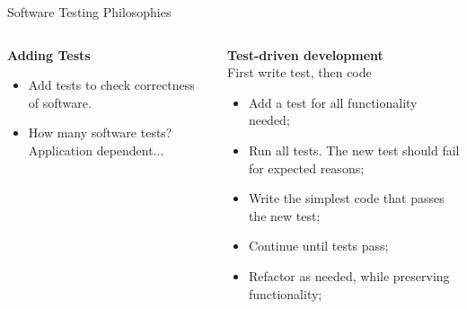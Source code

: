 \documentclass{setbeamer}
\begin{document}
\begin{frame}{Software Testing Philosophies}

\vspace{1cm}

	\begin{columns}[T]
        \begin{column}{0.5\textwidth}
            \textbf{Adding Tests}\\
            \begin{itemize}
            	\item 
            	Add tests to check correctness of software.
            	\item
            	How many software tests? Application dependent...
            \end{itemize}
        \end{column}
        \begin{column}{0.5\textwidth}
            \textbf{Test-driven development}\\
            First write test, then code
            \begin{itemize}
            	\item 
            	Add a test for all functionality needed;
            	\item
            	Run all tests. The new test should fail for expected reasons;
            	\item
            	Write the simplest code that passes the new test;
            	\item 
            	Continue until tests pass;
            	\item
            	Refactor as needed, while preserving functionality;
            \end{itemize}
        \end{column}
	\end{columns}
        
    
\end{frame}
\end{document}
